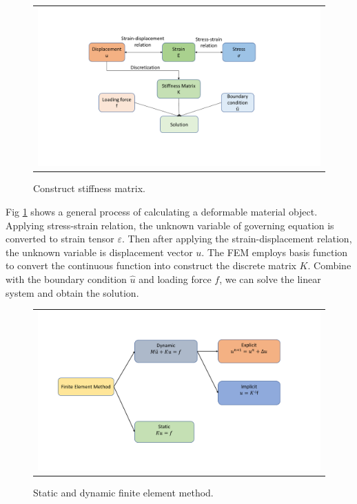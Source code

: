 \begin{figure}[H]
	\centering
	\begin{tabular}{c}
		\includegraphics[trim = 40mm 25mm 0mm 10mm,clip,width=1.2\textwidth]{./pics/construct_matrix}
	\end{tabular}
	\caption{\footnotesize Construct stiffness matrix.} \label{fig: ch1f2}
\end{figure}

Fig \ref{fig: ch1f2} shows a general process of calculating a deformable material object. Applying stress-strain relation, the unknown variable of governing equation is converted to strain tensor $ \varepsilon $. Then after applying the strain-displacement relation, the unknown variable is displacement vector $ u $. The FEM employs basis function to convert the continuous function into construct the discrete matrix $ K $. Combine with the boundary condition $ \hat{u} $ and loading force $ f $, we can solve the linear system and obtain the solution.

\begin{figure}[H]
	\centering
	\begin{tabular}{c}
		\includegraphics[width=1.1\textwidth]{./pics/fem}
	\end{tabular}
	\caption{\footnotesize Static and dynamic finite element method.} \label{fig: ch1f3}
\end{figure}

